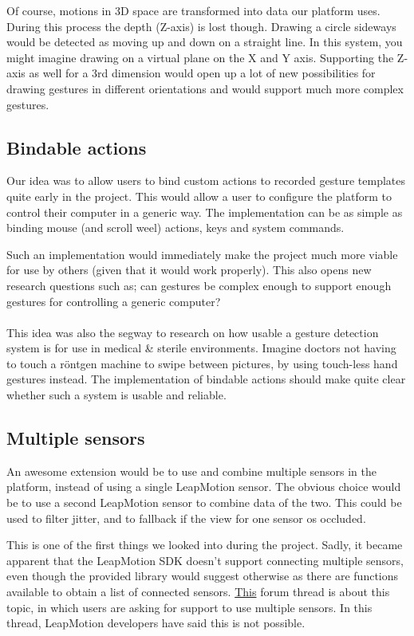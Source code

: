 \documentclass[a4paper]{article}
\begin{document}
  Of course, motions in 3D space are transformed into data our platform uses.
  During this process the depth (Z-axis) is lost though. Drawing a circle
  sideways would be detected as moving up and down on a straight line. In this
  system, you might imagine drawing on a virtual plane on the X and Y axis.
  Supporting the Z-axis as well for a 3rd dimension would open up a lot of new
  possibilities for drawing gestures in different orientations and would support
  much more complex gestures.

  \subsection*{Bindable actions}
  Our idea was to allow users to bind custom actions to recorded gesture
  templates quite early in the project. This would allow a user to configure the
  platform to control their computer in a generic way. The implementation can be
  as simple as binding mouse (and scroll weel) actions, keys and system commands.

  Such an implementation would immediately make the project much more viable for
  use by others (given that it would work properly). This also opens new
  research questions such as; can gestures be complex enough to support enough
  gestures for controlling a generic computer?

  \paragraph{}
  This idea was also the segway to research on how usable a gesture detection
  system is for use in medical \& sterile environments. Imagine doctors not
  having to touch a röntgen machine to swipe between pictures, by using
  touch-less hand gestures instead. The implementation of bindable actions
  should make quite clear whether such a system is usable and reliable.

  \subsection*{Multiple sensors}
  An awesome extension would be to use and combine multiple sensors in the
  platform, instead of using a single LeapMotion sensor. The obvious choice
  would be to use a second LeapMotion sensor to combine data of the two. This
  could be used to filter jitter, and to fallback if the view for one sensor os
  occluded.

  This is one of the first things we looked into during the project. Sadly, it
  became apparent that the LeapMotion SDK doesn't support connecting multiple
  sensors, even though the provided library would suggest otherwise as there are
  functions available to obtain a list of connected sensors.
  \href{https://forums.leapmotion.com/t/multiple-leap-motion-support/770}{This}
  forum thread is about this topic, in which users are asking for support to use
  multiple sensors. In this thread, LeapMotion developers have said this is not
  possible.
\end{document}

